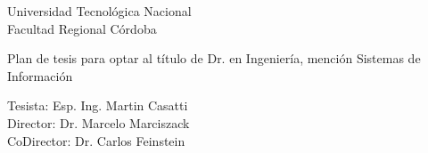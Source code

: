 \thispagestyle{empty}

\begin{center}
	\vspace*{3cm}
	
	
	\vspace{2cm}
	
	\LARGE{Universidad Tecnológica Nacional\\
		Facultad Regional Córdoba}
	
	\vspace{2cm}
	
	\LARGE{Plan de tesis para optar al título de Dr. en Ingeniería, mención Sistemas de Información}
	
	\vspace{2cm}
\end{center}

\begin{flushright} 
	\Large{
		Tesista: Esp. Ing. Martin Casatti\\
		Director: Dr. Marcelo Marciszack\\
		CoDirector: Dr. Carlos Feinstein
	}
\end{flushright} 
